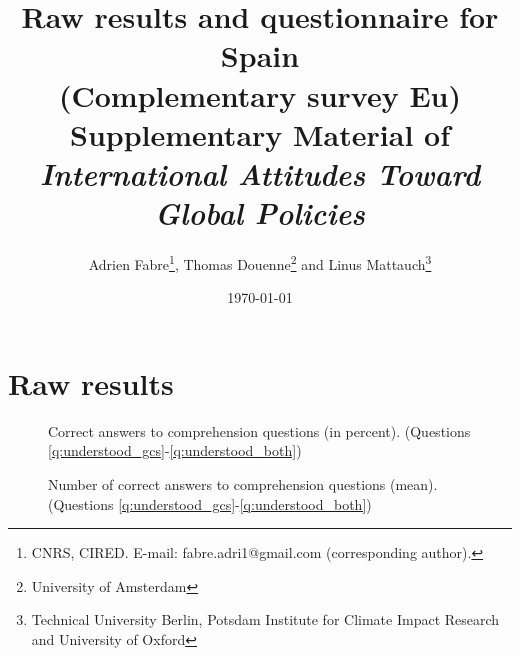 \documentclass[12pt,english]{article}
\title{Raw results and questionnaire for Spain \\
(Complementary survey Eu) \\ 
Supplementary Material of \\
\textit{International Attitudes Toward Global Policies}
}
\author{Adrien Fabre\footnote{CNRS, CIRED. E-mail: fabre.adri1@gmail.com (corresponding author).}, Thomas Douenne\footnote{University of Amsterdam}\; and Linus Mattauch\footnote{Technical University Berlin, Potsdam Institute for Climate Impact Research and University of Oxford}} %
\date{\today} %
\begin{document}
\maketitle

\tableofcontents

\clearpage
\listoffigures


\clearpage
\section{Raw results}\label{app:raw_results_ES}

\begin{figure}[h!]
    \caption[Comprehension]{Correct answers to comprehension questions (in percent). (Questions \ref{q:understood_gcs}-\ref{q:understood_both})}\label{fig:understood_each}
\end{figure}

\begin{figure}[h!]
    \caption[Comprehension score]{Number of correct answers to comprehension questions (mean). (Questions \ref{q:understood_gcs}-\ref{q:understood_both})}\label{fig:understood_score}
\end{figure}
\end{document}
